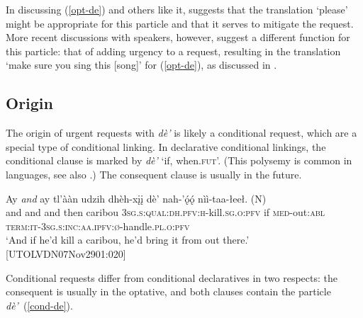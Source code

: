 \documentclass[output=paper,colorlinks,citecolor=brown]{langscibook}
\begin{document}
\noindent In discussing (\ref{opt-de}) and others like it, \citet[269]{LovickO2016} suggests that the translation `please' might be appropriate for this particle and that it serves to mitigate the request. More recent discussions with speakers, however, suggest a different function for this particle: that of adding urgency to a request, resulting in the translation `make sure you sing this [song]' for (\ref{opt-de}), as discussed in .

\subsection{Origin}
\label{subsection:urgent-origin}

The origin of urgent requests with \textit{dè'} is likely a conditional request, which are a special type of conditional linking. In declarative conditional linkings, the conditional clause is marked by \textit{dè'} `if, when.\textsc{fut}'. (This polysemy is common in  languages, see also \citealt{AnismanA2019}.) The consequent clause is usually in the future.

\ea \label{conditional}
\gll Ay \textit{and} ay tl'ààn udzih dhèh-xįį dè' nah-'ǫ́ǫ́ nìì-taa-łeeł. \textnormal{(N)} \\
and and and then caribou \textsc{3sg.s:qual:dh.pfv:h}-kill.\textsc{sg.o:pfv} if \textsc{med}-out:\textsc{abl} \textsc{term:it-3sg.s:inc:aa.ipfv:ø}-handle.\textsc{pl.o:pfv} \\
\glt `And if he'd kill a caribou, he'd bring it from out there.' \\ \hfill [UTOLVDN07Nov2901:020]
\z

Conditional requests differ from conditional declaratives in two respects: the consequent is usually in the optative, and both clauses contain the particle \textit{dè'}~(\ref{cond-de}).
\end{document}
